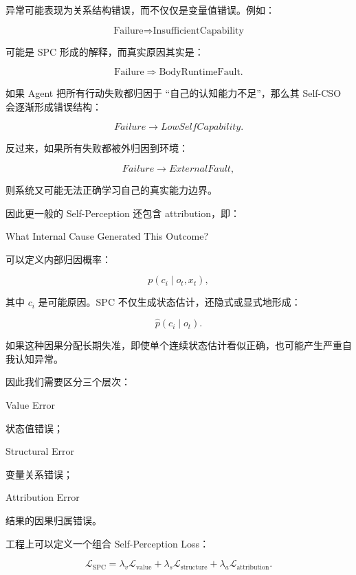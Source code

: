 异常可能表现为关系结构错误，而不仅仅是变量值错误。例如：

\[
\text{Failure}
\Rightarrow
\text{InsufficientCapability}
\]

可能是 SPC 形成的解释，而真实原因其实是：

\[
\text{Failure}
\Rightarrow
\text{BodyRuntimeFault}.
\]

如果 Agent 把所有行动失败都归因于 ``自己的认知能力不足''，那么其 Self-CSO 会逐渐形成错误结构：

\[
Failure
\rightarrow
LowSelfCapability.
\]

反过来，如果所有失败都被外归因到环境：

\[
Failure
\rightarrow
ExternalFault,
\]

则系统又可能无法正确学习自己的真实能力边界。

因此更一般的 Self-Perception 还包含 attribution，即：

\begin{statementbox}
What Internal Cause Generated This Outcome?
\end{statementbox}

可以定义内部归因概率：

\[
p(c_i\mid o_t,x_t),
\]

其中 $c_i$ 是可能原因。SPC 不仅生成状态估计，还隐式或显式地形成：

\[
\hat p(c_i\mid o_t).
\]

如果这种因果分配长期失准，即使单个连续状态估计看似正确，也可能产生严重自我认知异常。

因此我们需要区分三个层次：

\begin{statementbox}
Value Error
\end{statementbox}

状态值错误；

\begin{statementbox}
Structural Error
\end{statementbox}

变量关系错误；

\begin{statementbox}
Attribution Error
\end{statementbox}

结果的因果归属错误。

工程上可以定义一个组合 Self-Perception Loss：

\[
\mathcal L_{\mathrm{SPC}}
=
\lambda_v
\mathcal L_{\mathrm{value}}
+
\lambda_s
\mathcal L_{\mathrm{structure}}
+
\lambda_a
\mathcal L_{\mathrm{attribution}}.
\]

